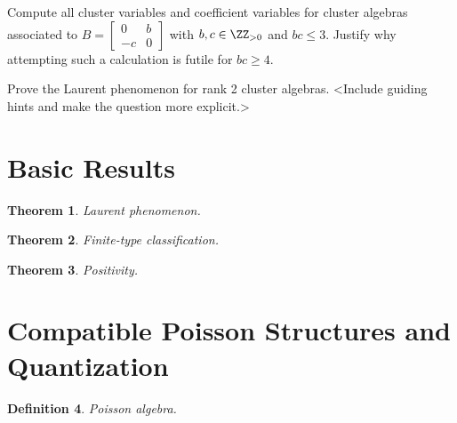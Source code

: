 \documentclass{amsart}
\newtheorem{theorem}{Theorem}[section]
\newtheorem{definition}[theorem]{Definition}
\theoremstyle{remark}
\numberwithin{equation}{section}
\begin{document}
  \begin{exercise}
    Compute all cluster variables and coefficient variables for cluster algebras associated to $B=\left[\begin{array}{cc} 0 & b\\ -c & 0\end{array}\right]$ with $b,c\in\ZZ_{>0}$ and $bc\le 3$.  Justify why attempting such a calculation is futile for $bc\ge4$.
  \end{exercise}

  \begin{exercise}
    Prove the Laurent phenomenon for rank 2 cluster algebras.  <Include guiding hints and make the question more explicit.>
  \end{exercise}

\section{Basic Results}

  \begin{theorem}
    Laurent phenomenon.
  \end{theorem}


  \begin{theorem}
    Finite-type classification.
  \end{theorem}

  \begin{theorem}
    Positivity.
  \end{theorem}


\section{Compatible Poisson Structures and Quantization}

  \begin{definition}
    Poisson algebra.
  \end{definition}
\end{document}
